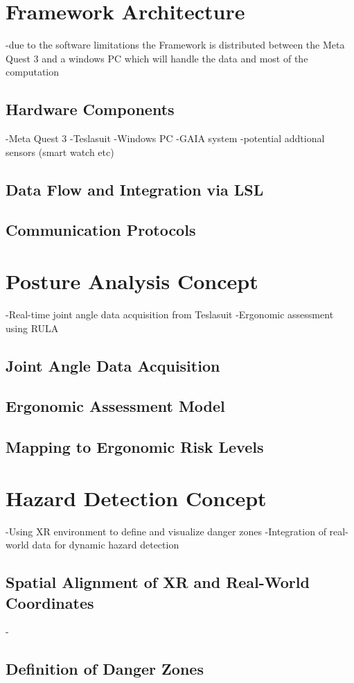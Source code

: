 \section{Framework Architecture}
-due to the software limitations the Framework is distributed between the Meta Quest 3 and a windows PC which will handle the data and most of the computation
\subsection{Hardware Components}
-Meta Quest 3
-Teslasuit
-Windows PC
-GAIA system
-potential addtional sensors (smart watch etc)
\subsection{Data Flow and Integration via LSL}
\subsection{Communication Protocols}

\section{Posture Analysis Concept}
-Real-time joint angle data acquisition from Teslasuit
-Ergonomic assessment using RULA
\subsection{Joint Angle Data Acquisition}
\subsection{Ergonomic Assessment Model}
\subsection{Mapping to Ergonomic Risk Levels}

\section{Hazard Detection Concept}
-Using XR environment to define and visualize danger zones
-Integration of real-world data for dynamic hazard detection
\subsection{Spatial Alignment of XR and Real-World Coordinates}
-
\subsection{Definition of Danger Zones}
